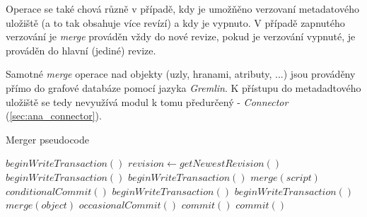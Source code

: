 Operace se také chová různě v případě, kdy je umožňěno verzovaní metadatového uložiště (a to tak obsahuje více revízí) a kdy je vypnuto. V případě zapnutého verzování je \textit{merge} prováděn vždy do nové revize, pokud je verzování vypnuté, je prováděn do hlavní (jediné) revize. 

Samotné \textit{merge} operace nad objekty (uzly, hranami, atributy, ...) jsou prováděny přímo do grafové databáze pomocí jazyka \textit{Gremlin}. K přístupu do metadadtového uložiště se tedy nevyužívá modul k tomu předurčený - \textit{Connector} (\ref{sec:ana_connector}).

\begin{algorithm} 
\caption{Merger pseudocode}
\label{alg_merger}
\begin{algorithmic}
	\State $beginWriteTransaction()$
	\State $revision\gets getNewestRevision()$
		\State $beginWriteTransaction()$
			\State $beginWriteTransaction()$
			\State $merge(script)$	
			\State $conditionalCommit()$
		\EndFor
		\State $beginWriteTransaction()$
			\State $beginWriteTransaction()$
			\State $merge(object)$	
			\State $occasionalCommit()$
		\EndFor
		\State $commit()$	
	\EndIf
	\State $commit()$
\end{algorithmic}
\end{algorithm}




